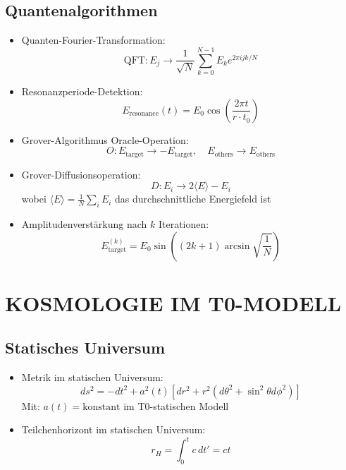 \documentclass[12pt,a4paper]{article}
\begin{document}
	\subsection{Quantenalgorithmen}
	\begin{itemize}
		\item Quanten-Fourier-Transformation:
		$$\text{QFT}: E_j \rightarrow \frac{1}{\sqrt{N}} \sum_{k=0}^{N-1} E_k e^{2\pi i jk/N}$$
		
		\item Resonanzperiode-Detektion:
		$$E_{\text{resonance}}(t) = E_0 \cos\left(\frac{2\pi t}{r \cdot t_0}\right)$$
		
		\item Grover-Algorithmus Oracle-Operation:
		$$O: E_{\text{target}} \rightarrow -E_{\text{target}}, \quad E_{\text{others}} \rightarrow E_{\text{others}}$$
		
		\item Grover-Diffusionsoperation:
		$$D: E_i \rightarrow 2\langle E \rangle - E_i$$
		wobei $\langle E \rangle = \frac{1}{N}\sum_i E_i$ das durchschnittliche Energiefeld ist
		
		\item Amplitudenverst\"{a}rkung nach $k$ Iterationen:
		$$E_{\text{target}}^{(k)} = E_0 \sin\left((2k+1)\arcsin\sqrt{\frac{1}{N}}\right)$$
	\end{itemize}
	
	\section{KOSMOLOGIE IM T0-MODELL}
	
	\subsection{Statisches Universum}
	\begin{itemize}
		\item Metrik im statischen Universum:
		$$ds^2 = -dt^2 + a^2(t)[dr^2 + r^2(d\theta^2 + \sin^2\theta d\phi^2)]$$
		Mit: $a(t) = \text{konstant}$ im T0-statischen Modell
		
		\item Teilchenhorizont im statischen Universum:
		$$r_H = \int_0^t c \, dt' = ct$$
	\end{itemize}
	
\end{document}
